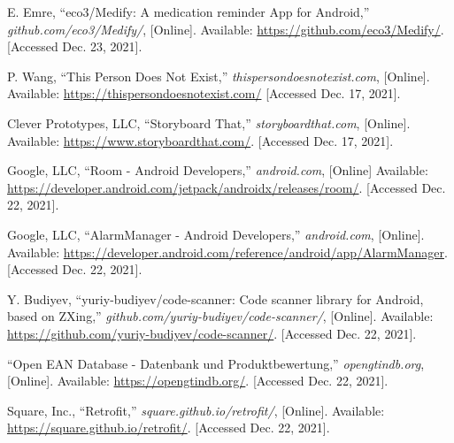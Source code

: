 \documentclass[conference]{IEEEtran}
\begin{document}
\newpage %
\begin{thebibliography}{00}	
	 E. Emre, ``eco3/Medify: A medication reminder App for Android,'' \textit{github.com/eco3/Medify/}, [Online]. Available: \url{https://github.com/eco3/Medify/}. [Accessed Dec. 23, 2021].
	
	 P. Wang, ``This Person Does Not Exist,'' \textit{thispersondoesnotexist.com}, [Online]. Available: \url{https://thispersondoesnotexist.com/} [Accessed Dec. 17, 2021].

	 Clever Prototypes, LLC, ``Storyboard That,'' \textit{storyboardthat.com}, [Online]. Available: \url{https://www.storyboardthat.com/}. [Accessed Dec. 17, 2021].
	
	 Google, LLC, ``Room - Android Developers,'' \textit{android.com}, [Online] Available: \url{https://developer.android.com/jetpack/androidx/releases/room/}. [Accessed Dec. 22, 2021].
		
	 Google, LLC, ``AlarmManager - Android Developers,'' \textit{android.com}, [Online]. Available: \url{https://developer.android.com/reference/android/app/AlarmManager}. [Accessed Dec. 22, 2021].

	 Y. Budiyev, ``yuriy-budiyev/code-scanner: Code scanner library for Android, based on ZXing,'' \textit{github.com/yuriy-budiyev/code-scanner/}, [Online]. Available: \url{https://github.com/yuriy-budiyev/code-scanner/}. [Accessed Dec. 22, 2021].

	 ``Open EAN Database - Datenbank und Produktbewertung,'' \textit{opengtindb.org}, [Online]. Available: \url{https://opengtindb.org/}. [Accessed Dec. 22, 2021].
	
	 Square, Inc., ``Retrofit,'' \textit{square.github.io/retrofit/}, [Online]. Available: \url{https://square.github.io/retrofit/}. [Accessed Dec. 22, 2021].
\end{thebibliography}
\end{document}
